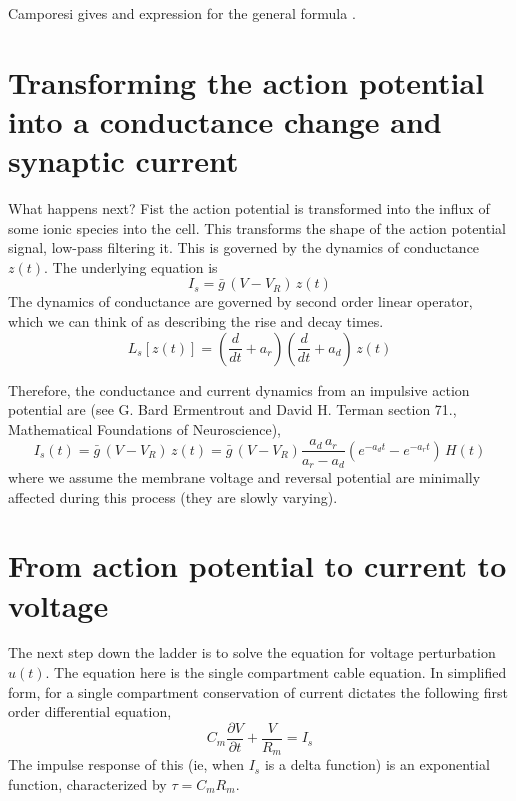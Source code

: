 \documentclass[11pt,oneside]{amsart}
\begin{document}
Camporesi gives and expression for the general formula \cite{camporesi11}.

\section{Transforming the action potential into a conductance change and synaptic current}

What happens next? Fist the action potential is transformed into the influx of some ionic species into the cell. This transforms the shape of the action potential signal, low-pass filtering  it. This is governed by the dynamics of conductance $z(t)$. The underlying equation is
\begin{equation}
I_s = \bar g \, (V-V_R)\,  z(t)
\end{equation}
The dynamics of conductance are governed by second order linear operator, which we can think of as describing the rise and decay times. 
$$
L_s[z(t)] = (\frac{d}{dt} + a_r)(\frac{d}{dt} +a_d) \, z(t)
$$

Therefore, the conductance and current dynamics from an impulsive action potential are (see G. Bard Ermentrout and David H. Terman section 71., Mathematical Foundations of Neuroscience),  
\begin{equation}
I_s(t) = \bar g \, (V-V_R)\,  z(t) = \bar g \, (V-V_R) \frac{a_d\, a_r}{a_r-a_d}(e^{-a_dt}-e^{-a_rt} )\,  H(t)
\end{equation}
where we assume the membrane voltage and reversal potential are minimally affected during this process (they are slowly varying).


\section{From action potential to current to voltage}
\label{sec:input}

The next step down the ladder is to solve the equation for voltage perturbation $u(t)$. 
The equation here is the single compartment cable equation. 
In simplified form, for a single compartment conservation of current dictates the following first order differential equation,
$$C_m \frac{\partial V}{\partial t} + \frac{V}{R_m}= I_s$$
The impulse response of this (ie, when $I_s$ is a delta function) is an exponential function, characterized by $\tau = C_m  R_m$. 
\end{document}
